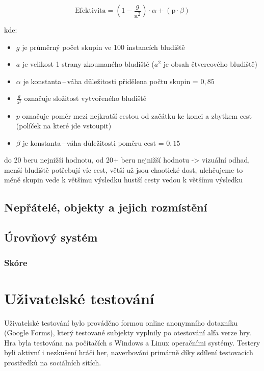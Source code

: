 \begin{equation}
    \text{Efektivita} = \left(1 - \frac{g}{\text{a}^2}\right) \cdot \alpha + \left(\text{p} \cdot \beta \right)
\end{equation}

kde: 
\begin{itemize}
    \item $g$ je průměrný počet skupin ve 100 instancích bludiště
    \item $a$ je velikost 1 strany zkoumaného bludiště ($a^2$ je obsah čtvercového bludiště)
    \item $\alpha$ je konstanta\,--\,váha důležitosti přidělena počtu skupin = $0,85$
    \item $\frac{g}{\text{a}^2}$ označuje složitost vytvořeného bludiště
    \item $p$ označuje poměr mezi nejkratší cestou od začátku ke konci a zbytkem cest (políček na které jde vstoupit)
    \item $\beta$ je konstanta\,--\,váha důležitosti poměru cest = $0,15$
\end{itemize}
do 20 beru nejnižší hodnotu, od 20+ beru nejnižší hodnotu -> vizuální odhad, menší bludiště potřebují víc cest, větší už jsou chaotické dost, ulehčujeme to
 méně skupin vede k většímu výsledku
  hustší cesty vedou k většímu výsledku
\newpage
\section{Nepřátelé, objekty a jejich rozmístění}

\section{Úrovňový systém}

\subsection*{Skóre}

\chapter{Uživatelské testování}\label{chap:Uživatelské testování}
Uživatelské testování bylo prováděno formou online anonymního dotazníku (Google Forms), který testované subjekty vyplnily po otestování alfa verze hry. Hra byla testována na počítačích s Windows a Linux operačními systémy. Testery byli aktivní i nezkušení hráči her, naverbováni primárně díky sdílení testovacích prostředků na sociálních sítích.
